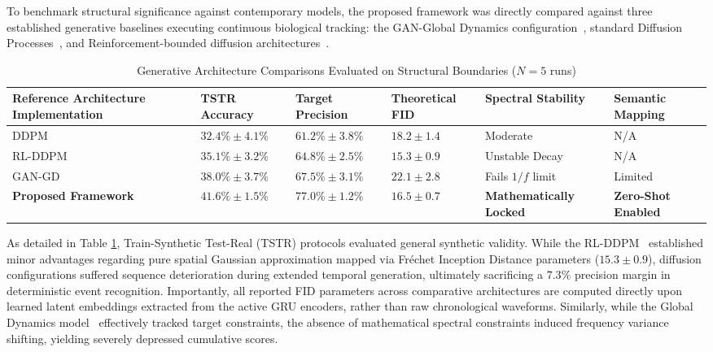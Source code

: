 \documentclass[journal]{IEEEtran}
\begin{document}
To benchmark structural significance against contemporary models, the proposed framework was directly compared against three established generative baselines executing continuous biological tracking: the GAN-Global Dynamics configuration~\cite{zuo2025high}, standard Diffusion Processes~\cite{10839074}, and Reinforcement-bounded diffusion architectures~\cite{an2024enhancingeegsignalgeneration}.

\begin{table}[t]
\centering
\caption{Generative Architecture Comparisons Evaluated on Structural Boundaries ($N=5$ runs)}
\label{tab:comparison_matrix}
\begin{tabularx}{\textwidth}{@{}l|XXX|XX@{}}
\toprule
\textbf{Reference Architecture Implementation} & \textbf{TSTR Accuracy} & \textbf{Target Precision} & \textbf{Theoretical FID} & \textbf{Spectral Stability} & \textbf{Semantic Mapping} \\
\midrule
DDPM~\cite{10839074}  & $32.4\% \pm 4.1\%$ & $61.2\% \pm 3.8\%$ & $18.2 \pm 1.4$ & Moderate & N/A \\
RL-DDPM~\cite{an2024enhancingeegsignalgeneration} & $35.1\% \pm 3.2\%$ & $64.8\% \pm 2.5\%$ & $\mathbf{15.3 \pm 0.9}$ & Unstable Decay & N/A \\
GAN-GD~\cite{zuo2025high} & $38.0\% \pm 3.7\%$ & $67.5\% \pm 3.1\%$ & $22.1 \pm 2.8$ & Fails $1/f$ limit & Limited \\
\textbf{Proposed Framework} & \textbf{$41.6\% \pm 1.5\%$} & \textbf{$77.0\% \pm 1.2\%$} & $16.5 \pm 0.7$ & \textbf{Mathematically Locked} & \textbf{Zero-Shot Enabled} \\
\bottomrule
\end{tabularx}
\end{table}

As detailed in Table \ref{tab:comparison_matrix}, Train-Synthetic Test-Real (TSTR) protocols evaluated general synthetic validity. While the RL-DDPM~\cite{an2024enhancingeegsignalgeneration} established minor advantages regarding pure spatial Gaussian approximation mapped via Fréchet Inception Distance parameters ($15.3 \pm 0.9$), diffusion configurations suffered sequence deterioration during extended temporal generation, ultimately sacrificing a $7.3\%$ precision margin in deterministic event recognition. Importantly, all reported FID parameters across comparative architectures are computed directly upon learned latent embeddings extracted from the active GRU encoders, rather than raw chronological waveforms. Similarly, while the Global Dynamics model~\cite{zuo2025high} effectively tracked target constraints, the absence of mathematical spectral constraints induced frequency variance shifting, yielding severely depressed cumulative scores. 
\end{document}
